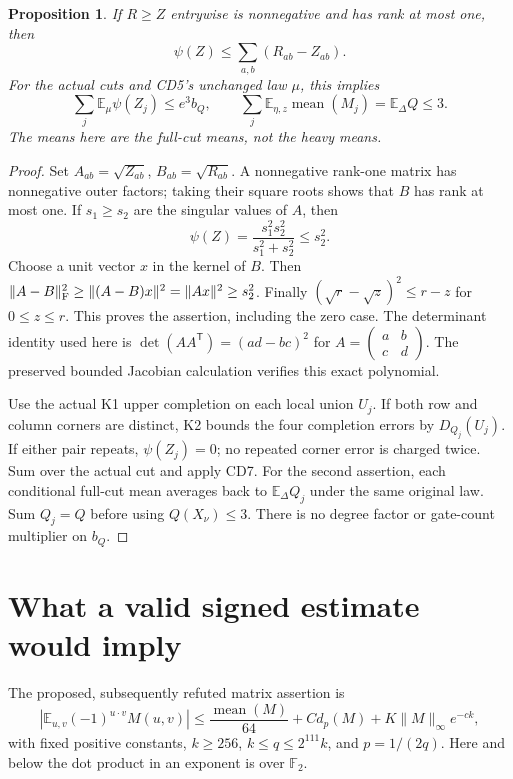 \documentclass[11pt]{article}
\newtheorem{proposition}{Proposition}
\newcommand{\E}{\mathbb E}
\begin{document}
\begin{proposition}
If $R\ge Z$ entrywise is nonnegative and has rank at most one, then
\[
 \psi(Z)\le\sum_{a,b}(R_{ab}-Z_{ab}).
\]
For the actual cuts and CD5's unchanged law $\mu$, this implies
\[
 \sum_j\E_\mu\psi(Z_j)\le e^3b_Q,\qquad
 \sum_j\E_{\eta,z}\operatorname{mean}(M_j)
       =\E_\Delta Q\le3.                                 \tag{ST2}
\]
The means here are the \emph{full-cut} means, not the heavy means.
\end{proposition}
\begin{proof}
Set $A_{ab}=\sqrt{Z_{ab}}$, $B_{ab}=\sqrt{R_{ab}}$.
A nonnegative rank-one matrix has nonnegative outer factors;
taking their square roots shows that $B$ has rank at most one.
If $s_1\ge s_2$ are the singular values of $A$, then
\[
 \psi(Z)=\frac{s_1^2s_2^2}{s_1^2+s_2^2}\le s_2^2.
\]
Choose a unit vector $x$ in the kernel of $B$. Then
$\|A-B\|_{\rm F}^2\ge\|(A-B)x\|^2=\|Ax\|^2\ge s_2^2$.
Finally
$(\sqrt r-\sqrt z)^2\le r-z$ for $0\le z\le r$.
This proves the assertion, including the zero case.
The determinant identity used here is
$\det(AA^{\mathsf T})=(ad-bc)^2$ for
$A=\left(\begin{smallmatrix}a&b\\c&d\end{smallmatrix}\right)$.
The preserved bounded Jacobian calculation verifies this exact polynomial.

Use the actual K1 upper completion on each local union $U_j$.
If both row and column corners are distinct, K2 bounds the four
completion errors by $D_{Q_j}(U_j)$.
If either pair repeats, $\psi(Z_j)=0$; no repeated corner error
is charged twice. Sum over the actual cut and apply CD7.
For the second assertion, each conditional full-cut mean averages
back to $\E_\Delta Q_j$ under the same original law.
Sum $Q_j=Q$ before using $Q(X_\nu)\le3$.
There is no degree factor or gate-count multiplier on $b_Q$.
\end{proof}

\section{What a valid signed estimate would imply}
The proposed, subsequently refuted matrix assertion is
\[
 |\E_{u,v}(-1)^{u\cdot v}M(u,v)|
 \le\frac{\operatorname{mean}(M)}{64}
          +C d_p(M)+K\|M\|_\infty e^{-ck},               \tag{ST3a}
\]
with fixed positive constants, $k\ge256$,
$k\le q\le2^{111}k$, and $p=1/(2q)$.
Here and below the dot product in an exponent is over $\mathbb F_2$.
\end{document}
